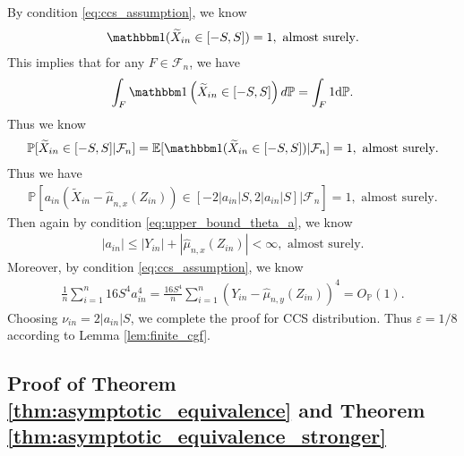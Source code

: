 \documentclass[12pt]{article}
\theoremstyle{definition}
\def\P{\mathbb{P}}
\def\P{\mathbb{P}}
\newcommand{\E}{\mathbb E}								%
\renewcommand{\P}{\mathbb{P}}							%
\newcommand{\indicator}{\mathbbm 1}						%
\newcommand{\srz}{Z}									%
\newcommand{\srxk}{\widetilde X}						%
\newcommand{\sry}{Y}									%
\begin{document}
By condition \eqref{eq:ccs_assumption}, we know 
\begin{align*}
  \indicator(\widetilde{X}_{in}\in [-S,S])=1,\text{ almost surely}.
\end{align*}
This implies that for any $F\in\mathcal{F}_n$, we have 
\begin{align*}
  \int_F \indicator\left(\widetilde{X}_{in}\in [-S,S]\right)d\mathbb{P}=\int_F 1 \mathrm{d}\mathbb P.
\end{align*}
Thus we know 
\begin{align*}
  \P[\widetilde{X}_{in}\in [-S,S]|\mathcal{F}_n]=\E[\indicator(\widetilde{X}_{in}\in [-S,S])|\mathcal{F}_n]=1,\text{ almost surely}.
\end{align*}
Thus we have
\begin{align*}
  \P\left[a_{in}(\srxk_{in}-\widehat{\mu}_{n,x}(\srz_{in}))\in [-2|a_{in}|S,2|a_{in}|S]|\mathcal{F}_n\right]=1,\text{ almost surely}.
\end{align*}
Then again by condition \eqref{eq:upper_bound_theta_a}, we know 
\begin{align*}
  |a_{in}|\leq |\sry_{in}|+|\widehat{\mu}_{n,x}(\srz_{in})|<\infty,\text{ almost surely}.
\end{align*}
Moreover, by condition \eqref{eq:ccs_assumption}, we know 
\begin{align*}
  \frac{1}{n}\sum_{i=1}^n 16S^4a_{in}^4=\frac{16S^4}{n}\sum_{i=1}^n (\sry_{in}-\widehat{\mu}_{n,y}(\srz_{in}))^4=O_{\P}(1).
\end{align*}
Choosing $\nu_{in}=2|a_{in}|S$, we complete the proof for CCS distribution. Thus $\varepsilon=1/8$ according to Lemma \ref{lem:finite_cgf}.


  \subsection{Proof of Theorem \ref{thm:asymptotic_equivalence} and Theorem \ref{thm:asymptotic_equivalence_stronger}}
\end{document}
